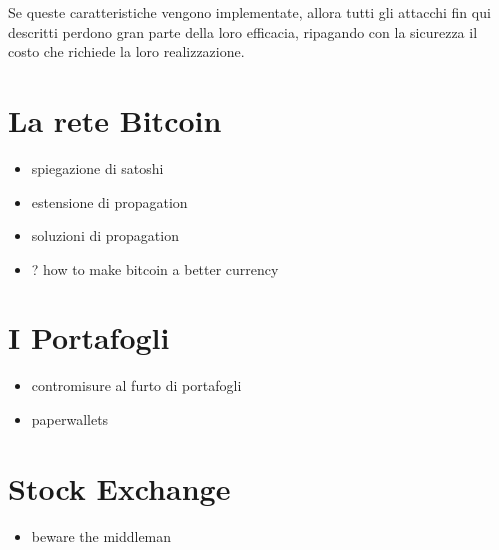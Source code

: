 Se queste caratteristiche vengono implementate, allora tutti gli
attacchi fin qui descritti perdono gran parte della loro efficacia,
ripagando con la sicurezza il costo che richiede la loro realizzazione.

\section{La rete Bitcoin}\label{la-rete-bitcoin}

\begin{itemize}
\itemsep1pt\parskip0pt
\item
  spiegazione di satoshi
\item
  estensione di propagation
\item
  soluzioni di propagation
\item
  ? how to make bitcoin a better currency
\end{itemize}

\section{I Portafogli}\label{i-portafogli}

\begin{itemize}
\itemsep1pt\parskip0pt
\item
  contromisure al furto di portafogli
\item
  paperwallets
\end{itemize}

\section{Stock Exchange}\label{stock-exchange}

\begin{itemize}
\itemsep1pt\parskip0pt
\item
  beware the middleman
\end{itemize}
